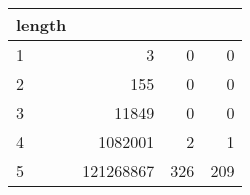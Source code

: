 \documentclass{beamer}
\renewcommand{\gets}{\leftarrow}
\newcommand{\AND}{\land}
\newcommand{\IOR}{\lor}
\newcommand{\XOR}{\oplus}
\begin{document}
%

\begin{frame}
\end{frame}


\begin{frame}
\begin{table}
\tiny
\begin{tabular}{l|rrr}
length & & & \\
\hline
1 &         3 &   0 &   0 \\
2 &       155 &   0 &   0 \\
3 &     11849 &   0 &   0 \\
4 &   1082001 &   2 &   1 \\
5 & 121268867 & 326 & 209 \\
\end{tabular}
\end{table}
\end{frame}
\end{document}
